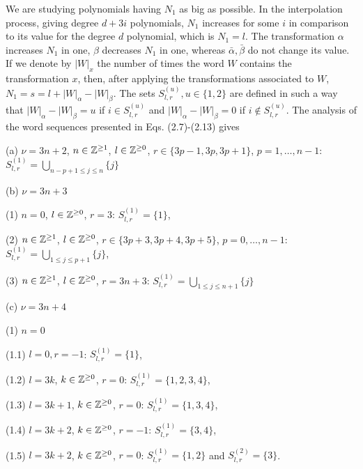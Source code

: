 \documentclass{birkjour_t2}
\theoremstyle{definition}
\theoremstyle{remark}
\numberwithin{equation}{section}
\begin{document}
 We are studying polynomials having $N_{1}$ as big as possible. In the interpolation process, giving degree $d+3i$ polynomials, $N_{1}$ increases for some $i$ in comparison to its value for the degree $d$ polynomial, which is $N_{1}=l$. The transformation $\alpha$ increases  $N_{1}$ in one, $\beta$ decreases  $N_{1}$ in one, whereas $\bar{\alpha}, \bar{\beta}$ do not change its value. If we denote by $|W|_{x}$ the number of times the word $W$ contains the transformation $x$, then, after applying the transformations associated  to $W$, $N_{1}=s=l+ |W|_{\alpha}-|W|_{\beta}$. The sets $S^{(u)}_{l, r}, u\in \{1, 2\}$ are defined in such a way that $|W|_{\alpha}-|W|_{\beta}=u$ if $i \in S^{(u)}_{l,r}$ and  $|W|_{\alpha}-|W|_{\beta}=0$ if 
    $i \notin S^{(u)}_{l,r}$.  The analysis of the word sequences presented in Eqs. (2.7)-(2.13) gives

      \bigskip\par\noindent
      (a) $\nu=3n+2$, $n \in  {\Bbb{Z}}^{\geq 1}$, $l \in  {\Bbb{Z}}^{\geq 0}$, $r \in \{3p-1, 3p, 3p+1\}$, $p=1, \dots, n-1$: $S^{(1)}_{l, r}=\bigcup_{n-p+1 \leq j \leq n} \{j\}$
      \bigskip\par\noindent
      (b) $\nu=3n+3$ 
      
      (1) $n=0$, $l \in  {\Bbb{Z}}^{\geq 0}$, $r=3$:  $S^{(1)}_{l, r}=\{1\}$,              
        
          (2) $n \in  {\Bbb{Z}}^{\geq 1}$, $l \in  {\Bbb{Z}}^{\geq 0}$, $r \in \{3p+3, 3p+4, 3p+5\}$, $p=0, \dots, n-1$: $S^{(1)}_{l, r}=\bigcup_{1 \leq j \leq p+1} \{j\}$,               
          
             (3) $n \in  {\Bbb{Z}}^{\geq 1}$, $l \in  {\Bbb{Z}}^{\geq 0}$, $r=3n+3$: $S^{(1)}_{l, r}=\bigcup_{1 \leq j \leq n+1} \{j\}$              
          
                \bigskip\par\noindent
      (c) $\nu=3n+4$
      
      (1) $n=0$
      
      (1.1) $l=0, r=-1$: $S^{(1)}_{l, r}=\{1\}$, 
      
      (1.2) $l=3k$, $k \in  {\Bbb{Z}}^{\geq 0}$, $r=0$: $S^{(1)}_{l, r}=\{1, 2, 3, 4\}$, 
      
      (1.3) $l=3k+1$, $k \in  {\Bbb{Z}}^{\geq 0}$, $r=0$:  $S^{(1)}_{l, r}=\{1, 3, 4\}$,
      
     (1.4) $l=3k+2$, $k \in  {\Bbb{Z}}^{\geq 0}$, $r=-1$:  $S^{(1)}_{l, r}=\{3, 4\}$,
     
       (1.5) $l=3k+2$, $k \in  {\Bbb{Z}}^{\geq 0}$, $r=0$: $S^{(1)}_{l, r}=\{1, 2\}$ and $S^{(2)}_{l, r}=\{3\}$.
       
\end{document}

